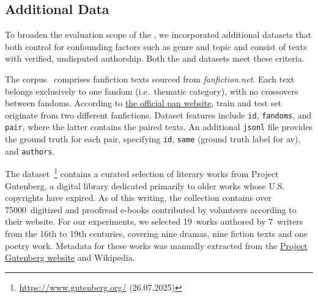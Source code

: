 \subsection{Additional Data}
\label{subsec:additional_data}
To broaden the evaluation scope of the \impAppr{}, we incorporated additional datasets that both control for confounding factors such as genre and topic and consist of texts with verified, undisputed authorship. 
Both the \dataPan{} and \dataGutenberg{} datasets meet these criteria.

The \dataPan{} corpus~\citep{bischoff_importance_2020} comprises fanfiction texts sourced from \textit{fanfiction.net}.
Each text belongs exclusively to one fandom (i.e.\ thematic category), with no crossovers between fandoms.
According to \href{https://pan.webis.de/clef20/pan20-web/author-identification.html}{the official \acs{pan} website}, 
train and test set originate from two different fanfictions.
Dataset features include \texttt{id}, \texttt{fandoms}, and \texttt{pair}, where the latter contains the paired texts.
An additional \texttt{jsonl} file provides the ground truth for each pair, specifying \texttt{id}, \texttt{same} (ground truth label for \ac{av}), and \texttt{authors}.

The \dataGutenberg{} dataset~\footnote{\url{https://www.gutenberg.org/} (26.07.2025)} contains a curated selection of literary works from Project Gutenberg, a digital library dedicated primarily to older works whose U.S. copyrights have expired.
As of this writing, the collection contains over \num{75000}~digitized and proofread e-books contributed by volunteers according to their website.
For our experiments, we selected 19~works authored by 7~writers from the 16th to 19th centuries, covering nine dramas, nine fiction texts and one poetry work.
Metadata for these works was manually extracted from the \href{https://www.gutenberg.org/}{Project Gutenberg website} and Wikipedia.



